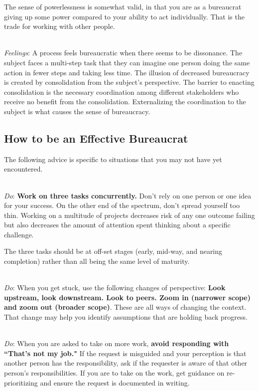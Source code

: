 The sense of powerlessness is somewhat valid, in that you are as a bureaucrat giving up some power compared to your ability to act individually. That is the trade for working with other people.

\ \\
\textit{Feelings}: A process feels bureaucratic when there seems to be dissonance. The subject faces a multi-step task that they can imagine one person doing the same action in fewer steps and taking less time. The illusion of decreased bureaucracy is created by consolidation from the subject's perspective. The barrier to enacting consolidation is the necessary coordination among different stakeholders who receive no benefit from the consolidation. Externalizing the coordination to the subject is what causes the sense of bureaucracy. 

\subsection*{How to be an Effective Bureaucrat}

The following advice is specific to situations that you may not have yet encountered. 

\ \\
\textit{Do}: \textbf{Work on three tasks concurrently.} Don't rely on one person or one idea for your success. On the other end of the spectrum, don't spread yourself too thin.
%
%
Working on a multitude of projects decreases risk of any one outcome failing but also decreases the amount of attention spent thinking about a specific challenge. 

The three tasks should be at off-set stages (early, mid-way, and nearing completion) rather than all being the same level of maturity.

\ \\
\textit{Do}: When you get stuck, use the following changes of perspective:  
\textbf{Look upstream, look downstream. Look to peers. Zoom in (narrower scope) and zoom out (broader scope)}. These are all ways of changing the context. That change may help you identify assumptions that are holding back progress.

\ \\
\textit{Do}: When you are asked to take on more work, \textbf{avoid responding with ``That's not my job."} If the request is misguided and your perception is that another person has the responsibility, ask if the requester is aware of that other person's responsibilities. If you are to take on the work, get guidance on re-prioritizing and ensure the request is documented in writing. 


